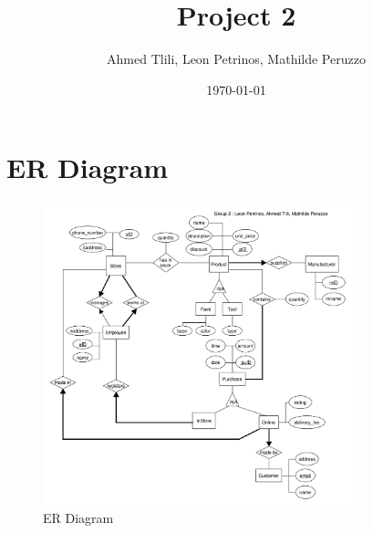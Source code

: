 \documentclass[a4paper,11pt]{article}
\title{Project 2}
\author{Ahmed Tlili, Leon Petrinos, Mathilde Peruzzo}
\date{\today}
\begin{document}
\maketitle

\section{ER Diagram}
\begin{figure}[h]
    \centering
    \includegraphics[width=0.8\textwidth]{ER.png}
    \caption{ER Diagram}
\end{figure}
\end{document}
